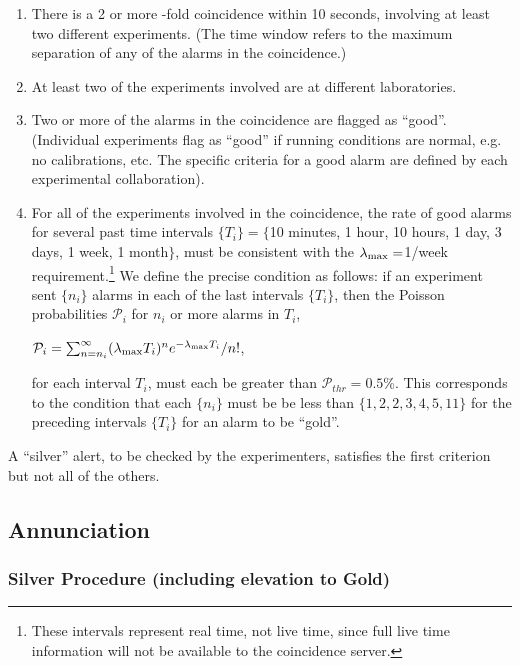 \documentclass{article}
\begin{document}
\begin{enumerate}

\item There is a 2 or more -fold coincidence within 10 seconds,
involving at least
two different experiments.  (The time window refers to the maximum
separation of any of the alarms in the coincidence.)

\item At least two of the experiments involved
are at different laboratories.

\item Two or more of the alarms in the coincidence
are flagged as ``good''.  (Individual experiments flag
as ``good'' if running conditions are normal, e.g. no
calibrations, etc.  The specific criteria for a good alarm are defined
by each experimental collaboration).

\item For all of the experiments involved in the coincidence,
the rate of good alarms for several past time intervals $\{T_i\}=\{$10 minutes, 1
hour, 10 hours, 1 day, 3 days, 1 week, 1 month$\}$, must be consistent with
the $\lambda_{\rm{max}}=$1/week requirement.\footnote{These intervals
represent real time, not live time, since full live time information
will not be available to the coincidence server.}
We define the precise condition 
as follows:  
if an experiment sent $\{n_i\}$ alarms in 
each of the last intervals $\{T_i\}$,
then the Poisson probabilities $\mathcal{P}_i$ for $n_i$ or more
alarms in $T_i$,

$\mathcal{P}_i=\sum_{n=n_i}^{\infty}(\lambda_{\rm{max}} T_i)^{n}e^{-\lambda_{\rm{max}} T_i}/n!$,

for each interval $T_i$, must each be greater than $\mathcal{P}_{thr}=0.5$\%.
This corresponds to the condition that each $\{n_i\}$ must be be less
than $\{1,2,2,3,4,5,11\}$ for the preceding intervals $\{T_i\}$ for an
alarm to be ``gold''.

\end{enumerate}

A ``silver'' alert, to be checked by the experimenters,
satisfies the first criterion but not all of the others.


\subsection{Annunciation}
\subsubsection{Silver Procedure (including elevation to Gold)}
\end{document}
